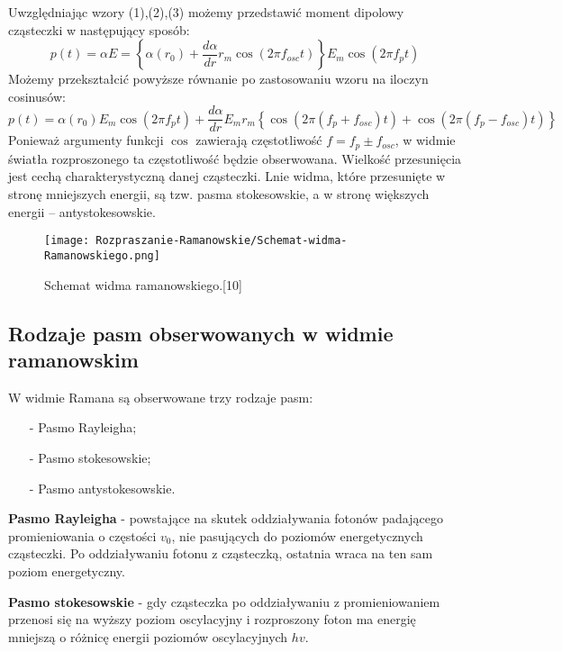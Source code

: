 Uwzględniając wzory (1),(2),(3) możemy przedstawić moment dipolowy cząsteczki w następujący
sposób:
\begin{equation}
	p(t) = \alpha E = 
	\left\{ 
		\alpha(r_{0}) + \frac{d\alpha}{dr}r_{m}\cos (2\pi f_{osc}t) 
	\right\}
	E_{m}\cos (2\pi f_{p}t)
\end{equation}
Możemy przekształcić powyższe równanie po zastosowaniu wzoru na iloczyn cosinusów:
\begin{equation}
	p(t) = \alpha(r_{0})E_{m}\cos (2\pi f_{p}t) + \frac{d\alpha}{dr}E_{m}r_{m}
	\left\{
		\cos (2\pi (f_{p} + f_{osc})t) + \cos (2\pi (f_{p} - f_{osc})t)
	 \right\}
\end{equation}
Ponieważ argumenty funkcji $\cos$ zawierają częstotliwość $f = f_{p} \pm f_{osc}$, w widmie światła
rozproszonego ta częstotliwość będzie obserwowana. Wielkość przesunięcia jest cechą charakterystyczną danej cząsteczki. Lnie widma, które przesunięte w stronę mniejszych energii, są tzw. pasma stokesowskie, a w stronę większych energii – antystokesowskie.
\begin{figure}[H]
	\begin{center}
		\texttt{[image: Rozpraszanie-Ramanowskie/Schemat-widma-Ramanowskiego.png]}
		\caption{Schemat widma ramanowskiego.[10]}
	\end{center}
\end{figure}

\subsection{Rodzaje pasm obserwowanych w widmie ramanowskim}
W widmie Ramana są obserwowane trzy rodzaje pasm:
\begin{itemize}
	\item[-]{Pasmo Rayleigha};
	\item[-]{Pasmo stokesowskie};
	\item[-]{Pasmo antystokesowskie}.
\end{itemize}

\textbf{Pasmo Rayleigha} - powstające na skutek oddziaływania fotonów padającego promieniowania o częstości $v_{0}$, nie pasujących do poziomów energetycznych cząsteczki. Po oddziaływaniu fotonu z cząsteczką, ostatnia wraca na ten sam poziom energetyczny.

\textbf{Pasmo stokesowskie} - gdy cząsteczka po oddziaływaniu z promieniowaniem przenosi się na wyższy poziom oscylacyjny i rozproszony foton ma energię mniejszą o różnicę energii poziomów oscylacyjnych $hv$.


